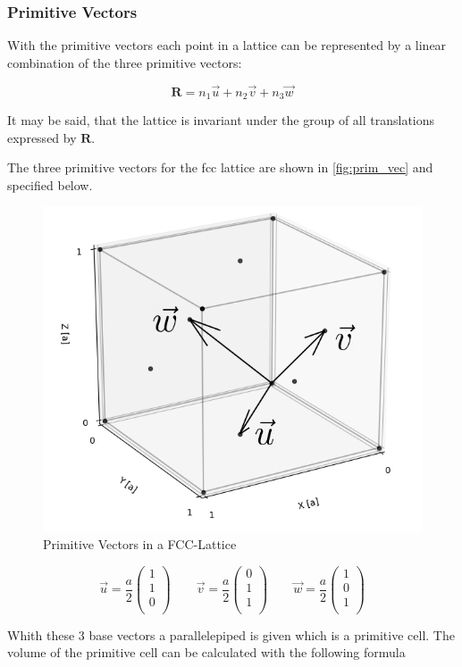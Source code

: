 \subsubsection*{Primitive Vectors}
With the primitive vectors each point in a lattice can be represented
by a linear combination of the three primitive vectors:

$$\mathbf{R} = n_1 \vec{u} + n_2 \vec{v} + n_3 \vec{w}$$

It may be said, that the lattice is invariant under the group of all 
translations expressed by $\mathbf{R}$.

The three primitive vectors for the fcc lattice are shown in 
\autoref{fig:prim_vec} and specified below.

\begin{figure}[H]
	\centering
	\includegraphics[width=0.5\linewidth]{Graphics/Chapter1/prim_vec}
	\caption{Primitive Vectors in a FCC-Lattice}
	\label{fig:prim_vec}
\end{figure}

$$\vec{u} = \frac{a}{2} \left(\begin{matrix}1\\1\\0\\\end{matrix}\right) \qquad
  \vec{v} = \frac{a}{2} \left(\begin{matrix}0\\1\\1\\\end{matrix}\right) \qquad
  \vec{w} = \frac{a}{2} \left(\begin{matrix}1\\0\\1\\\end{matrix}\right)$$

Whith these 3 base vectors a parallelepiped is given which is a primitive cell.
The volume of the primitive cell can be calculated with the following formula

